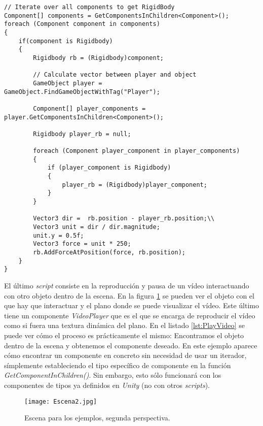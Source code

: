 \documentclass{pre-tfg}
\begin{document}
\begin{spacing}{1}
\begin{lstlisting}[float=htbp, caption=Aplicación de una fuerza a un objeto con físicas, label=lst:applyForce]
// Iterate over all components to get RigidBody
Component[] components = GetComponentsInChildren<Component>();
foreach (Component component in components)
{
	if(component is Rigidbody)
	{
		Rigidbody rb = (Rigidbody)component;

		// Calculate vector between player and object
		GameObject player = GameObject.FindGameObjectWithTag("Player");

		Component[] player_components = player.GetComponentsInChildren<Component>();

		Rigidbody player_rb = null;

		foreach (Component player_component in player_components)
		{
			if (player_component is Rigidbody)
			{
				player_rb = (Rigidbody)player_component;
			}
		}

		Vector3 dir =  rb.position - player_rb.position;\\
		Vector3 unit = dir / dir.magnitude;
		unit.y = 0.5f;
		Vector3 force = unit * 250;
		rb.AddForceAtPosition(force, rb.position);
	}
}
\end{lstlisting}
\end{spacing}

El último \textit{script} consiste en la reproducción y pausa de un vídeo interactuando con otro objeto dentro de la escena. En la figura \ref{fig:Escena2} se pueden ver el objeto con el que hay que interactuar y el plano donde se puede visualizar el vídeo. Este último tiene un componente \textit{VideoPlayer} que es el que se encarga de reproducir el vídeo como si fuera una textura dinámica del plano. En el listado \ref{lst:PlayVideo} se puede ver cómo el proceso es prácticamente el mismo: Encontramos el objeto dentro de la escena y obtenemos el componente deseado. En este ejemplo aparece cómo encontrar un componente en concreto sin necesidad de usar un iterador, símplemente estableciendo el tipo específico de componente en la función \textit{GetComponentInChildren()}. Sin embargo, esto sólo funcionará con los componentes de tipos ya definidos en \textit{Unity} (no con otros \textit{scripts}). 

\begin{figure}[htb]
	\centering
	\texttt{[image: Escena2.jpg]}
	\caption{Escena para los ejemplos, segunda perspectiva.}
	\label{fig:Escena2}
\end{figure}
\end{document}
